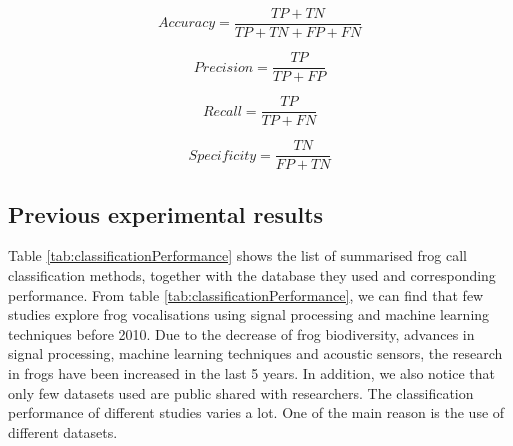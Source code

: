 \begin{equation}
Accuracy = \frac{TP+TN}{TP+TN+FP+FN}
\end{equation}

\begin{equation}
Precision = \frac{TP}{TP+FP}
\end{equation}

\begin{equation}
Recall = \frac{TP}{TP+FN}
\end{equation}

\begin{equation}
Specificity = \frac{TN}{FP+TN}
\end{equation}


\subsection{Previous experimental results}


Table \ref{tab:classificationPerformance} shows the list of summarised frog call classification methods, together with the database they used and corresponding performance. From table \ref{tab:classificationPerformance}, we can find that few studies explore  frog vocalisations using signal processing and machine learning techniques before 2010. Due to the decrease of frog biodiversity, advances in signal processing, machine learning techniques and acoustic sensors, the research in frogs have been increased in the last 5 years. In addition, we also notice that only few datasets used are public shared with researchers. The classification performance of different studies varies a lot. One of the main reason is the use of different datasets. 




